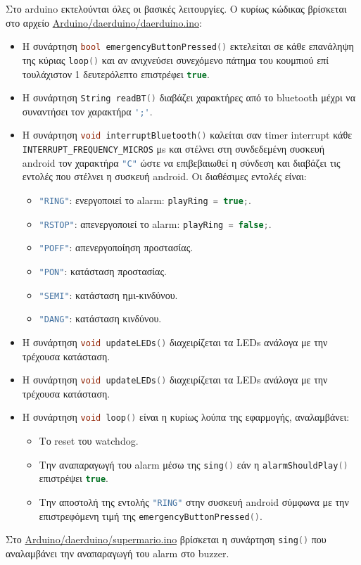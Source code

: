 Στο arduino εκτελούνται όλες οι βασικές λειτουργίες.
Ο κυρίως κώδικας βρίσκεται στο αρχείο \url{Arduino/daerduino/daerduino.ino}:
\begin{itemize}
\item \sloppy Η συνάρτηση \lstinline[language=C++]!bool emergencyButtonPressed()! εκτελείται σε κάθε επανάληψη της κύριας \lstinline[language=C++]!loop()! και αν ανιχνεύσει συνεχόμενο πάτημα του κουμπιού επί τουλάχιστον 1 δευτερόλεπτο επιστρέφει \lstinline[language=C++]!true!.

\item Η συνάρτηση \lstinline[language=C++]!String readBT()! διαβάζει χαρακτήρες από το bluetooth μέχρι να συναντήσει τον χαρακτήρα \lstinline[language=C++]!';'!.

\item Η συνάρτηση \lstinline[language=C++]!void interruptBluetooth()! καλείται σαν timer interrupt
κάθε \lstinline[language=C++]!INTERRUPT_FREQUENCY_MICROS! \si{\micro\second}
και στέλνει στη συνδεδεμένη συσκευή android τον χαρακτήρα \lstinline[language=C++]!"C"! ώστε να επιβεβαιωθεί η σύνδεση και διαβάζει τις εντολές που στέλνει η συσκευή android.
Οι διαθέσιμες εντολές είναι:
\begin{itemize}
\item \lstinline[language=C++]!"RING"!: ενεργοποιεί το alarm: \lstinline[language=C++]!playRing = true;!.
\item \lstinline[language=C++]!"RSTOP"!: απενεργοποιεί το alarm: \lstinline[language=C++]!playRing = false;!.
\item \lstinline[language=C++]!"POFF"!: απενεργοποίηση προστασίας.
\item \lstinline[language=C++]!"PON"!: κατάσταση προστασίας.
\item \lstinline[language=C++]!"SEMI"!: κατάσταση ημι-κινδύνου.
\item \lstinline[language=C++]!"DANG"!: κατάσταση κινδύνου.
\end{itemize}

\item Η συνάρτηση \lstinline[language=C++]!void updateLEDs()! διαχειρίζεται τα LEDs ανάλογα με την τρέχουσα κατάσταση.

\item Η συνάρτηση \lstinline[language=C++]!void updateLEDs()! διαχειρίζεται τα LEDs ανάλογα με την τρέχουσα κατάσταση.

\item Η συνάρτηση \lstinline[language=C++]!void loop()! είναι η κυρίως λούπα της εφαρμογής, αναλαμβάνει:
\begin{itemize}
\item Το reset του watchdog.
\item Την αναπαραγωγή του alarm μέσω της \lstinline[language=C++]!sing()! εάν η \lstinline[language=C++]!alarmShouldPlay()! επιστρέψει \lstinline[language=C++]!true!.
\item Την αποστολή της εντολής \lstinline[language=C++]!"RING"! στην συσκευή android σύμφωνα με την επιστρεφόμενη τιμή της \lstinline[language=C++]!emergencyButtonPressed()!.
\end{itemize}
\end{itemize}

Στο \url{Arduino/daerduino/supermario.ino}
βρίσκεται η συνάρτηση \lstinline[language=C++]!sing()! που αναλαμβάνει την αναπαραγωγή του alarm στο buzzer.
